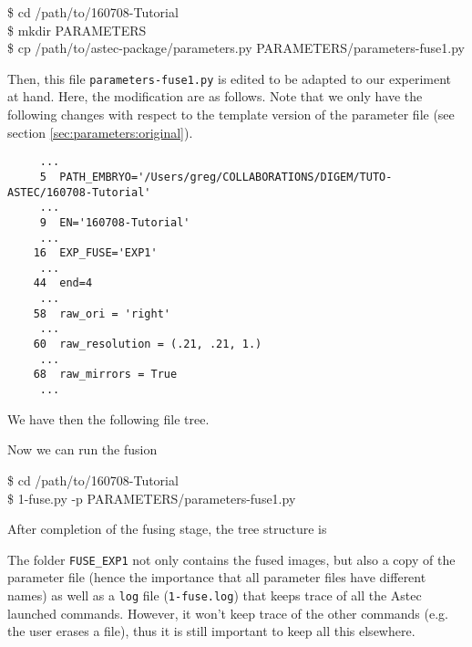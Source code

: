 \begin{code}{0.8}
\$ cd /path/to/160708-Tutorial\\
\$ mkdir PARAMETERS\\
\$ cp /path/to/astec-package/parameters.py  PARAMETERS/parameters-fuse1.py
\end{code}


Then, this file \texttt{parameters-fuse1.py} is edited to be adapted to our experiment at hand. Here, the modification are as follows. Note that we only have the following changes with respect to the template version of the parameter file (see section \ref{sec:parameters:original}).

\begin{verbatim}
     ...
     5	PATH_EMBRYO='/Users/greg/COLLABORATIONS/DIGEM/TUTO-ASTEC/160708-Tutorial'	
     ...
     9	EN='160708-Tutorial'			
     ... 
    16	EXP_FUSE='EXP1'	
     ...
    44	end=4   				 
     ...
    58	raw_ori = 'right' 				
     ...
    60	raw_resolution = (.21, .21, 1.) 
     ...
    68	raw_mirrors = True  			
     ...
\end{verbatim}

We have then the following file tree.


Now we can run the fusion

\begin{code}{0.8}
\$ cd /path/to/160708-Tutorial\\
\$ 1-fuse.py -p PARAMETERS/parameters-fuse1.py 
\end{code}

After completion of the fusing stage, the tree structure is 

The folder \texttt{FUSE\_EXP1} not only contains the fused images, but also a copy of the parameter file (hence the importance that all parameter files have different names) as well as a \texttt{log} file (\texttt{1-fuse.log}) that keeps trace of all the Astec launched commands. However, it won't keep trace of the other commands (e.g. the user erases a file), thus it is still important to keep all this elsewhere.










